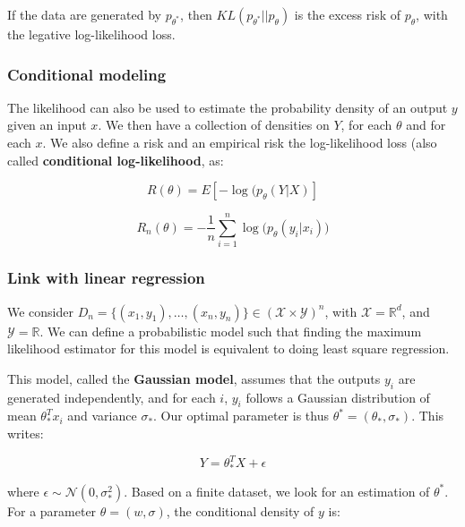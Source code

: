 \documentclass[
10pt, %
a4paper, %
oneside, %
headinclude,footinclude, %
BCOR5mm, %
]{scrartcl}
\begin{document}
\begin{lemma}
    
    If the data are generated by $p_{\theta^*}$, then $ KL(p_{\theta^*}||p_{\theta})$ is the excess risk of $p_{\theta}$, with the legative log-likelihood loss.
\end{lemma}

\subsubsection{\large\color{Periwinkle}Conditional modeling}

The likelihood can also be used to estimate the probability density of an output $y$ given an input $x$. We then have a collection of densities on $Y$, for each $\theta$ and for each $x$. We also define a risk and an empirical risk the log-likelihood loss (also called \textbf{{conditional log-likelihood}}, as:

\begin{equation}
    R(\theta) = E[-\log(p_{\theta}(Y|X)]
\end{equation}

\begin{equation}
    R_n(\theta) = - \frac{1}{n} \sum^{n}_{i=1} \log\big(p_{\theta}(y_i|x_i)\big)
\end{equation}

\subsubsection{\large\color{Periwinkle}Link with linear regression}

We consider $D_n = \{(x_1, y_1), \dots, (x_n, y_n)\}\in (\mathcal{X}\times \mathcal{Y})^n$, with $ \mathcal{X} = \mathbb{R}^d$, and $ \mathcal{Y} = \mathbb{R} $. We can define a probabilistic model such that finding the maximum likelihood estimator for this model is equivalent to doing least square regression.

This model, called the \textbf{{Gaussian model}}, assumes that the outputs $y_i$ are generated independently, and for each $i$, $y_i$ follows a Gaussian distribution of mean $\theta_*^Tx_i$ and variance $\sigma_*$. Our optimal parameter is thus $\theta^* =(\theta_*, \sigma_*)$. This writes:

\begin{equation*}
    Y = \theta_*^TX+\epsilon
\end{equation*}

where $\epsilon\sim \mathcal{N}(0, \sigma_*^2)$. Based on a finite dataset, we look for an estimation of $\theta^*$. For a parameter $\theta=(w, \sigma)$, the conditional density of $y$ is:
\end{document}
